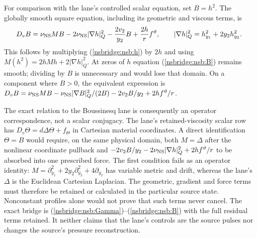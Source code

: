 For comparison with the lane's controlled scalar equation, set
$B=h^2$. The globally smooth square equation, including its geometric and
viscous terms, is
\begin{equation}
 D_vB=\nu_{\rm NS}MB-2\nu_{\rm NS}
 |\nabla h|_Q^2-\frac{2v_2}{y_2}B+\frac{2h}{r}f^\vartheta,
 \qquad |\nabla h|_Q^2=h_{y_1}^2+2y_2h_{y_2}^2.
 \label{nsbridge:nsb:B}
\end{equation}
This follows by multiplying (\ref{nsbridge:nsb:h}) by $2h$ and using
$M(h^2)=2hMh+2|\nabla h|_Q^2$. At zeros of $h$ equation
(\ref{nsbridge:nsb:B}) remains smooth; dividing by $B$ is unnecessary and would lose
that domain. On a component where $B>0$, the equivalent expression is
$D_vB=\nu_{\rm NS}MB-\nu_{\rm NS}|\nabla B|_Q^2/(2B)
-2v_2B/y_2+2hf^\vartheta/r$.

The exact relation to the Boussinesq lane is consequently an operator
correspondence, not a scalar conjugacy. The lane's retained-viscosity scalar
row has $D_v\Theta=d\Delta\Theta+f_\Theta$ in Cartesian material
coordinates. A direct identification $\Theta=B$ would require, on the same
physical domain, both $M=\Delta$ after the nonlinear coordinate pullback and
$-2v_2B/y_2-2\nu_{\rm NS}|\nabla h|_Q^2+2hf^\vartheta/r$ to be absorbed into
one prescribed force. The first condition fails as an operator identity:
$M=\partial_{y_1}^2+2y_2\partial_{y_2}^2+4\partial_{y_2}$ has variable metric
and drift, whereas the lane's $\Delta$ is the Euclidean Cartesian Laplacian.
The geometric, gradient and force terms must therefore be retained or
calculated in the particular source state. Nonconstant profiles alone
would not prove that such terms never cancel.
The exact bridge is (\ref{nsbridge:nsb:Gamma})--(\ref{nsbridge:nsb:B}) with the
full residual terms retained. It neither claims that the lane's controls are
the source pulses nor changes the source's pressure reconstruction.

